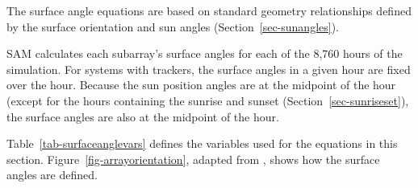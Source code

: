 \documentclass[12pt,letterpaper]{article}
\begin{document}
The surface angle equations are based on standard geometry relationships defined by the surface orientation and sun angles (Section~\ref{sec-sunangles}).

SAM calculates each subarray's surface angles for each of the 8,760 hours of the simulation. For systems with trackers, the surface angles in a given hour are fixed over the hour. Because the sun position angles are at the midpoint of the hour (except for the hours containing the sunrise and sunset (Section~\ref{sec-sunriseset}), the surface angles are also at the midpoint of the hour.

Table~\ref{tab-surfaceanglevars} defines the variables used for the equations in this section. Figure~\ref{fig-arrayorientation}, adapted from \citet{dunlap2007}, shows how the surface angles are defined.

\end{document}

